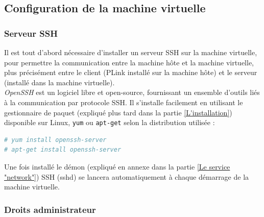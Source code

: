 
\subsection{Configuration de la machine virtuelle}
\label{Contrôle - Configuration machine virtuelle}


\subsubsection{Serveur SSH}
\label{Serveur SSH}

Il est tout d'abord nécessaire d'installer un serveur SSH sur la machine virtuelle, pour permettre la communication entre la machine hôte et la machine virtuelle, plus précisément entre le client (PLink installé sur la machine hôte) et le serveur (installé dans la machine virtuelle).
\\


\textit{OpenSSH} est un logiciel libre et open-source, fournissant un ensemble d'outils liés à la communication par protocole SSH.
Il s'installe facilement en utilisant le gestionnaire de paquet (expliqué plus tard dans la partie \ref{L'installation}) disponible sur Linux, \lstinline{yum} ou \lstinline{apt-get} selon la distribution utilisée :
\begin{lstlisting}[language = sh]
# yum install openssh-server
# apt-get install openssh-server 
\end{lstlisting}
Une fois installé le démon (expliqué en annexe dans la partie \ref{Le service "network"}) SSH (sshd) se lancera automatiquement à chaque démarrage de la machine virtuelle.
\\




\subsubsection{Droits administrateur}

